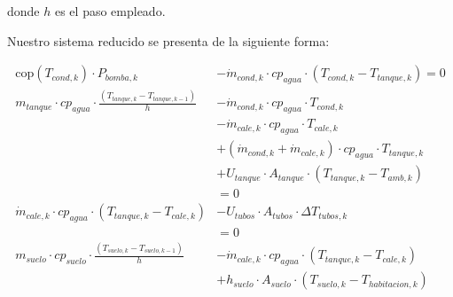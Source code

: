 donde $h$ es el paso empleado.

Nuestro sistema reducido se presenta de la siguiente forma:

\begin{align}
	\text{cop}(T_{cond,k}) \cdot P_{bomba,k}                                                    & - \dot{m}_{cond,k} \cdot cp_{agua} \cdot \left(T_{cond,k} - T_{tanque,k}\right) = 0                     \\
	m_{tanque} \cdot cp_{agua} \cdot \frac{\left(T_{tanque,k} - T_{tanque,k-1}\right)}{h}       & - \dot{m}_{cond,k} \cdot cp_{agua} \cdot T_{cond,k} \nonumber                                           \\
	                                                                                            & - \dot{m}_{cale,k} \cdot cp_{agua} \cdot T_{cale,k} \nonumber                                           \\
	                                                                                            & + (\dot{m}_{cond,k} + \dot{m}_{cale,k}) \cdot cp_{agua} \cdot T_{tanque,k} \nonumber                    \\
	                                                                                            & + U_{tanque} \cdot A_{tanque} \cdot (T_{tanque,k} - T_{amb,k}) \nonumber                                \\
	                                                                                            & = 0                                                                                                     \\
	\dot{m}_{cale,k} \cdot cp_{agua} \cdot \left(T_{tanque,k} - T_{cale,k}\right)               & - U_{tubos} \cdot A_{tubos} \cdot \Delta T_{tubos,k} \nonumber                                          \\
	                                                                                            & = 0                                                                                                     \\
	m_{suelo} \cdot cp_{suelo} \cdot \frac{\left(T_{suelo,k} - T_{suelo,k-1}\right)}{h}         & - \dot{m}_{cale,k} \cdot cp_{agua} \cdot (T_{tanque,k} - T_{cale,k}) \nonumber                          \\
	                                                                                            & + h_{suelo} \cdot A_{suelo} \cdot (T_{suelo,k} - T_{habitacion,k}) \nonumber                            \\

\end{align}

